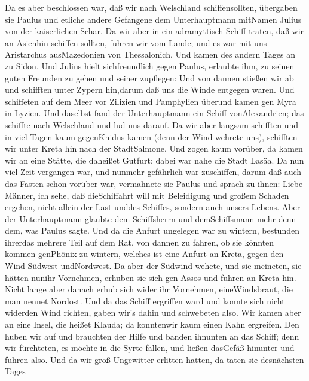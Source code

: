  Da es aber beschlossen war, daß wir nach Welschland
schiffensollten, übergaben sie Paulus und etliche andere Gefangene dem
Unterhauptmann mitNamen Julius von der kaiserlichen Schar. 
Da wir aber in ein adramyttisch Schiff traten, daß wir an Asienhin
schiffen sollten, fuhren wir vom Lande; und es war mit uns Aristarchus
ausMazedonien von Thessalonich.  Und kamen des andern Tages
an zu Sidon. Und Julius hielt sichfreundlich gegen Paulus, erlaubte ihm,
zu seinen guten Freunden zu gehen und seiner zupflegen:  Und
von dannen stießen wir ab und schifften unter Zypern hin,darum daß uns
die Winde entgegen waren.  Und schiffeten auf dem Meer vor
Zilizien und Pamphylien überund kamen gen Myra in Lyzien. 
Und daselbst fand der Unterhauptmann ein Schiff vonAlexandrien; das
schiffte nach Welschland und lud uns darauf.  Da wir aber
langsam schifften und in viel Tagen kaum gegenKnidus kamen (denn der
Wind wehrete uns), schifften wir unter Kreta hin nach der StadtSalmone.
 Und zogen kaum vorüber, da kamen wir an eine Stätte, die
daheißet Gutfurt; dabei war nahe die Stadt Lasäa.  Da nun
viel Zeit vergangen war, und nunmehr gefährlich war zuschiffen, darum
daß auch das Fasten schon vorüber war, vermahnete sie Paulus
 und sprach zu ihnen: Liebe Männer, ich sehe, daß
dieSchiffahrt will mit Beleidigung und großem Schaden ergehen, nicht
allein der Last unddes Schiffes, sondern auch unsers Lebens.
 Aber der Unterhauptmann glaubte dem Schiffsherrn und
demSchiffsmann mehr denn dem, was Paulus sagte.  Und da die
Anfurt ungelegen war zu wintern, bestunden ihrerdas mehrere Teil auf dem
Rat, von dannen zu fahren, ob sie könnten kommen genPhönix zu wintern,
welches ist eine Anfurt an Kreta, gegen den Wind Südwest undNordwest.
 Da aber der Südwind wehete, und sie meineten, sie hätten
nunihr Vornehmen, erhuben sie sich gen Assos und fuhren an Kreta hin.
 Nicht lange aber danach erhub sich wider ihr Vornehmen,
eineWindsbraut, die man nennet Nordost.  Und da das Schiff
ergriffen ward und konnte sich nicht widerden Wind richten, gaben wir's
dahin und schwebeten also.  Wir kamen aber an eine Insel,
die heißet Klauda; da konntenwir kaum einen Kahn ergreifen.
 Den huben wir auf und brauchten der Hilfe und banden
ihnunten an das Schiff; denn wir fürchteten, es möchte in die Syrte
fallen, und ließen dasGefäß hinunter und fuhren also.  Und
da wir groß Ungewitter erlitten hatten, da taten sie desnächsten Tages
